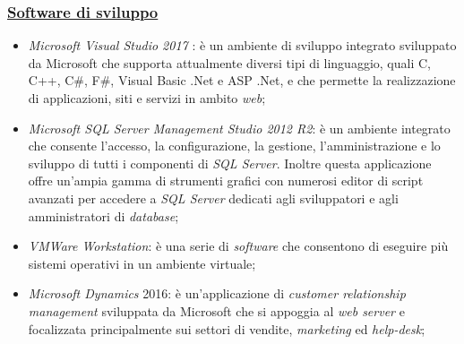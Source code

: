 \subsubsection{\underline{Software di sviluppo}}
\begin{itemize}
    \item \emph{Microsoft Visual Studio 2017} : è un ambiente di sviluppo integrato sviluppato da Microsoft che supporta attualmente diversi tipi di linguaggio, quali C, C++, C\#, F\#, Visual Basic .Net e ASP .Net, e che permette la realizzazione di applicazioni, siti e servizi in ambito \emph{web};\cite{microsoft-visual}
    \item  \emph{Microsoft SQL Server Management Studio 2012 R2}: è un ambiente integrato che consente l'accesso, la configurazione, la gestione, l'amministrazione e lo sviluppo di tutti i componenti di \emph{SQL Server}. Inoltre questa applicazione offre un'ampia gamma di strumenti grafici con numerosi editor di script avanzati per accedere a \emph{SQL Server} dedicati agli sviluppatori e agli amministratori di \emph{database};\cite{microsoft-sql}
    \item \emph{VMWare Workstation}: è una serie di \emph{software} che consentono di eseguire più sistemi operativi in un ambiente virtuale;\cite{microsoft-vm}
    \item \emph{Microsoft Dynamics}  2016: è un'applicazione  di \emph{customer relationship management} sviluppata da Microsoft che si appoggia al \emph{web server}  e focalizzata principalmente sui settori di vendite, \emph{marketing} ed \emph{help-desk};
\end{itemize}
